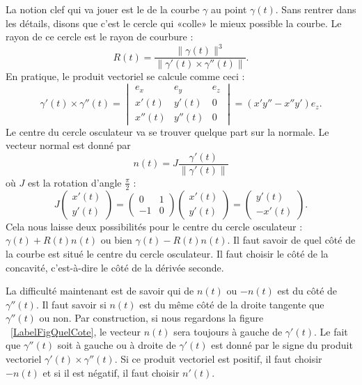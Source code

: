 La notion clef qui va jouer est le  de la courbe \( \gamma\) au point \( \gamma(t)\). Sans rentrer dans les détails, disons que c'est le cercle qui «colle» le mieux possible la courbe. Le rayon de ce cercle est le rayon de courbure :
\begin{equation}
	R(t)=\frac{ \| \gamma(t) \|^3 }{ \| \gamma'(t)\times\gamma''(t) \| }.
\end{equation}
En pratique, le produit vectoriel se calcule comme ceci :
\begin{equation}
	\gamma'(t)\times\gamma''(t)=\begin{vmatrix}
		e_x    & e_y    & e_z \\
		x'(t)  & y'(t)  & 0   \\
		x''(t) & y''(t) & 0
	\end{vmatrix}=(x'y''-x''y')e_z.
\end{equation}
Le centre du cercle osculateur va se trouver quelque part sur la normale. Le vecteur normal est donné par
\begin{equation}
	n(t)=J\frac{\gamma'(t) }{ \| \gamma'(t) \| }
\end{equation}
où \( J\) est la rotation d'angle \( \frac{ \pi }{2}\) :
\begin{equation}
	J\begin{pmatrix}
		x'(t) \\
		y'(t)
	\end{pmatrix}=
	\begin{pmatrix}
		0  & 1 \\
		-1 & 0
	\end{pmatrix}\begin{pmatrix}
		x'(t) \\
		y'(t)
	\end{pmatrix}=\begin{pmatrix}
		y'(t) \\
		-x'(t)
	\end{pmatrix}.
\end{equation}
Cela nous laisse deux possibilités pour le centre du cercle osculateur : \( \gamma(t)+R(t)n(t)\) ou bien \( \gamma(t)-R(t)n(t)\). Il faut savoir de quel côté de la courbe est situé le centre du cercle osculateur. Il faut choisir le côté de la concavité, c'est-à-dire le côté de la dérivée seconde.

\newcommand{\CaptionFigQuelCote}{De quel côté de \( \gamma'(t)\) se trouvent \( n(t)\) et \( -n(t)\) ?}


La difficulté maintenant est de savoir qui de \( n(t)\) ou \( -n(t)\) est du côté de \( \gamma''(t)\). Il faut savoir si \( n(t)\) est du même côté de la droite tangente que \( \gamma''(t)\) ou non. Par construction, si nous regardons la figure ~\ref{LabelFigQuelCote}, le vecteur \( n(t)\) sera toujours à gauche de \( \gamma'(t)\). Le fait que \( \gamma''(t)\) soit à gauche ou à droite de \( \gamma'(t)\) est donné par le signe du produit vectoriel \( \gamma'(t)\times \gamma''(t)\). Si ce produit vectoriel est positif, il faut choisir \( -n(t)\) et si il est négatif, il faut choisir \( n'(t)\).

